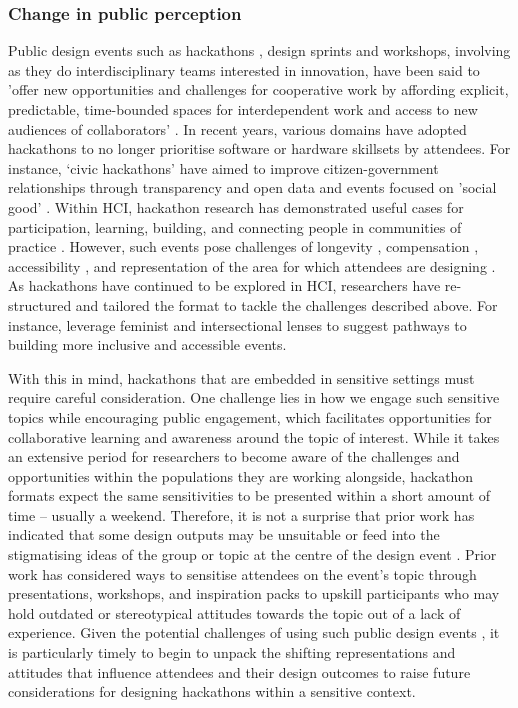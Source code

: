\subsubsection{Change in public perception}
\label{BL:Chapter6Overview}
Public design events such as hackathons \citep{olesen_what_2021}, design sprints and workshops, involving as they do interdisciplinary teams interested in innovation, have been said to ’offer new opportunities and challenges for cooperative work by affording explicit, predictable, time-bounded spaces for interdependent work and access to new audiences of collaborators’ \citep{filippova_hacking_2017}. In recent years, various domains have adopted hackathons to no longer prioritise software or hardware skillsets by attendees. For instance, ‘civic hackathons’ \citep{johnson_civic_2014} have aimed to improve citizen-government relationships through transparency and open data and events focused on 'social good' \citep{ferrario_software_2014}. Within HCI, hackathon research has demonstrated useful cases for participation, learning, building, and connecting people in communities of practice \citep{falk_olesen_10_2020,hou_hacking_2017,trainer_how_2016}. However, such events pose challenges of longevity \citep{birbeck_self_2017}, compensation \citep{endrissat_hackathons_2018}, accessibility \citep{hope_hackathons_2019}, and representation of the area for which attendees are designing \citep{toombs_hackerspace_2017}. As hackathons have continued to be explored in HCI, researchers have re-structured and tailored the format to tackle the challenges described above. For instance, \cite{hope_hackathons_2019} leverage feminist and intersectional lenses to suggest pathways to building more inclusive and accessible events. 

With this in mind, hackathons that are embedded in sensitive settings must require careful consideration. 
One challenge lies in how we engage such sensitive topics while encouraging public engagement, which facilitates opportunities for collaborative learning and awareness around the topic of interest. While it takes an extensive period for researchers to become aware of the challenges and opportunities within the populations they are working alongside, hackathon formats expect the same sensitivities to be presented within a short amount of time – usually a weekend. Therefore, it is not a surprise that prior work has indicated that some design outputs may be unsuitable or feed into the stigmatising ideas of the group or topic at the centre of the design event \citep{toros_co-creation_2020}. Prior work has considered ways to sensitise attendees on the event's topic through presentations, workshops, and inspiration packs \citep{birbeck_self_2017} to upskill participants who may hold outdated or stereotypical attitudes towards the topic out of a lack of experience. Given the potential challenges of using such public design events \citep{toombs_proper_2015,kienzler_learning_2017}, it is particularly timely to begin to unpack the shifting representations and attitudes that influence attendees and their design outcomes to raise future considerations for designing hackathons within a sensitive context.

